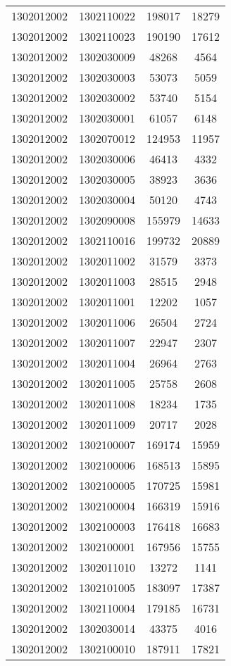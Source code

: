 \begin{longtable}[h]{llcc}
		1302012002 & 1302110022 & 198017 & 18279\\
		1302012002 & 1302110023 & 190190 & 17612\\
		1302012002 & 1302030009 & 48268 & 4564\\
		1302012002 & 1302030003 & 53073 & 5059\\
		1302012002 & 1302030002 & 53740 & 5154\\
		1302012002 & 1302030001 & 61057 & 6148\\
		1302012002 & 1302070012 & 124953 & 11957\\
		1302012002 & 1302030006 & 46413 & 4332\\
		1302012002 & 1302030005 & 38923 & 3636\\
		1302012002 & 1302030004 & 50120 & 4743\\
		1302012002 & 1302090008 & 155979 & 14633\\
		1302012002 & 1302110016 & 199732 & 20889\\
		1302012002 & 1302011002 & 31579 & 3373\\
		1302012002 & 1302011003 & 28515 & 2948\\
		1302012002 & 1302011001 & 12202 & 1057\\
		1302012002 & 1302011006 & 26504 & 2724\\
		1302012002 & 1302011007 & 22947 & 2307\\
		1302012002 & 1302011004 & 26964 & 2763\\
		1302012002 & 1302011005 & 25758 & 2608\\
		1302012002 & 1302011008 & 18234 & 1735\\
		1302012002 & 1302011009 & 20717 & 2028\\
		1302012002 & 1302100007 & 169174 & 15959\\
		1302012002 & 1302100006 & 168513 & 15895\\
		1302012002 & 1302100005 & 170725 & 15981\\
		1302012002 & 1302100004 & 166319 & 15916\\
		1302012002 & 1302100003 & 176418 & 16683\\
		1302012002 & 1302100001 & 167956 & 15755\\
		1302012002 & 1302011010 & 13272 & 1141\\
		1302012002 & 1302101005 & 183097 & 17387\\
		1302012002 & 1302110004 & 179185 & 16731\\
		1302012002 & 1302030014 & 43375 & 4016\\
		1302012002 & 1302100010 & 187911 & 17821\\

\end{longtable}
